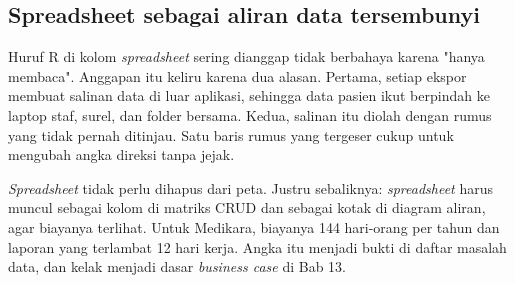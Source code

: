 \subsection*{Spreadsheet sebagai aliran data tersembunyi}

Huruf R di kolom \textit{spreadsheet} sering dianggap tidak berbahaya karena
"hanya membaca". Anggapan itu keliru karena dua alasan. Pertama, setiap
ekspor membuat salinan data di luar aplikasi, sehingga data pasien ikut
berpindah ke laptop staf, surel, dan folder bersama. Kedua, salinan itu diolah
dengan rumus yang tidak pernah ditinjau. Satu baris rumus yang tergeser cukup
untuk mengubah angka direksi tanpa jejak.

\textit{Spreadsheet} tidak perlu dihapus dari peta. Justru sebaliknya:
\textit{spreadsheet} harus muncul sebagai kolom di matriks CRUD dan sebagai
kotak di diagram aliran, agar biayanya terlihat. Untuk Medikara, biayanya
144 hari-orang per tahun dan laporan yang terlambat 12 hari kerja. Angka itu
menjadi bukti di daftar masalah data, dan kelak menjadi dasar
\textit{business case} di Bab 13.

